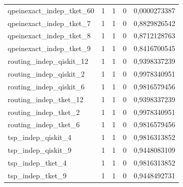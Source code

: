 \begin{longtable}{lrrrr}
qpeinexact\_indep\_tket\_60 & 1 & 1 & 0 & 0,0000273387 \\
qpeinexact\_indep\_tket\_7 & 1 & 1 & 0 & 0,8829826542 \\
qpeinexact\_indep\_tket\_8 & 1 & 1 & 0 & 0,8712128763 \\
qpeinexact\_indep\_tket\_9 & 1 & 1 & 0 & 0,8416700545 \\
routing\_indep\_qiskit\_12 & 1 & 1 & 0 & 0,9398337239 \\
routing\_indep\_qiskit\_2 & 1 & 1 & 0 & 0,9978340951 \\
routing\_indep\_qiskit\_6 & 1 & 1 & 0 & 0,9816579456 \\
routing\_indep\_tket\_12 & 1 & 1 & 0 & 0,9398337239 \\
routing\_indep\_tket\_2 & 1 & 1 & 0 & 0,9978340951 \\
routing\_indep\_tket\_6 & 1 & 1 & 0 & 0,9816579456 \\
tsp\_indep\_qiskit\_4 & 1 & 1 & 0 & 0,9816313852 \\
tsp\_indep\_qiskit\_9 & 1 & 1 & 0 & 0,9448083109 \\
tsp\_indep\_tket\_4 & 1 & 1 & 0 & 0,9816313852 \\
tsp\_indep\_tket\_9 & 1 & 1 & 0 & 0,9448492731 \\
\end{longtable}
\endgroup
